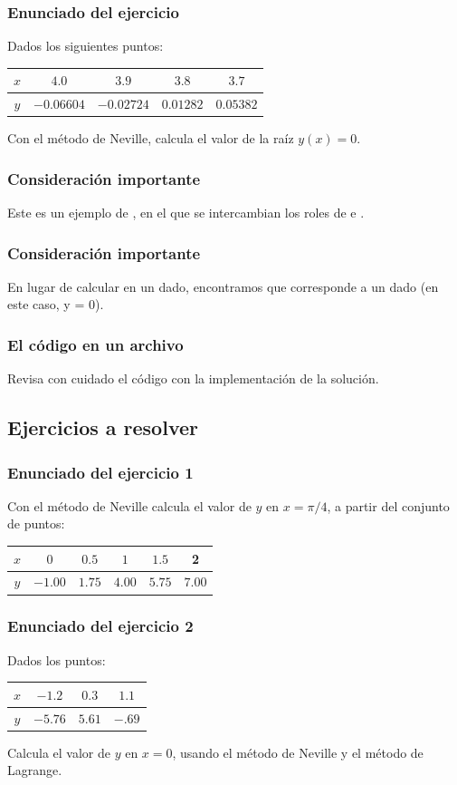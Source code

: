 \documentclass[12pt]{beamer}
\begin{document}
\begin{frame}
\frametitle{Enunciado del ejercicio}
Dados los siguientes puntos:
\begin{table}
\centering
\begin{tabular}{| c | c | c | c | c |}
$x$ & $4.0$ & $3.9$ & $3.8$ & $3.7$ \\ \hline
$y$ & $-0.06604$ & $-0.02724$ & $0.01282$ & $0.05382$ \\	
\end{tabular}
\end{table}
Con el método de Neville, calcula el valor de la raíz $y (x) = 0$.
\end{frame}
\begin{frame}
\frametitle{Consideración importante}
Este es un ejemplo de , \pause en el que se intercambian los roles de  e .
\end{frame}
\begin{frame}
\frametitle{Consideración importante}
En lugar de calcular  en un  dado, \pause encontramos  que corresponde a un  dado (en este caso, y = 0).
\end{frame}
\begin{frame}
\frametitle{El código en un archivo}
Revisa con cuidado el código con la implementación de la solución. 
\end{frame}

\subsection{Ejercicios a resolver}

\begin{frame}
\frametitle{Enunciado del ejercicio 1}
Con el método de Neville calcula el valor de $y$ en $x = \pi /4$, a partir del conjunto de puntos:
\begin{table}
\centering
\begin{tabular}{| c | c | c | c | c | c |}
$x$ & $0$ & $0.5$ & $1$ & $1.5$ & 2 \\ \hline
$y$ & $-1.00$ & $1.75$ & $4.00$ & $5.75$ & $7.00$ \\	
\end{tabular}
\end{table}
\end{frame}
\begin{frame}
\frametitle{Enunciado del ejercicio 2}
Dados los puntos:
\begin{table}
\centering
\begin{tabular}{| c | c | c | c |}
$x$ & $-1.2$ & $0.3$ & $1.1$ \\ \hline
$y$ & $-5.76$ & $5.61$ & $-.69$ \\	
\end{tabular}
\end{table}
Calcula el valor de $y$ en $x = 0$, usando el método de Neville y el método de Lagrange.
\end{frame}
\end{document}
